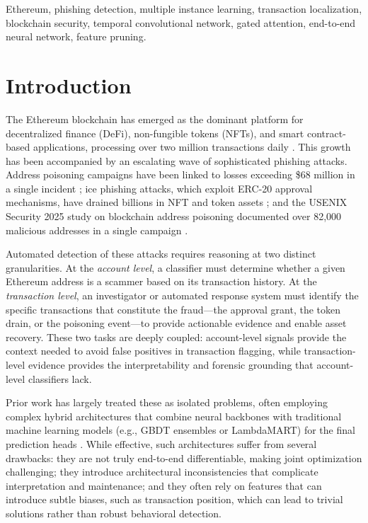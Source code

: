 \documentclass[conference]{IEEEtran}
\begin{document}
\begin{IEEEkeywords}
Ethereum, phishing detection, multiple instance learning, transaction localization, blockchain security, temporal convolutional network, gated attention, end-to-end neural network, feature pruning.
\end{IEEEkeywords}

\section{Introduction}
The Ethereum blockchain has emerged as the dominant platform for decentralized finance (DeFi), non-fungible tokens (NFTs), and smart contract-based applications, processing over two million transactions daily \cite{etherscan}. This growth has been accompanied by an escalating wave of sophisticated phishing attacks. Address poisoning campaigns have been linked to losses exceeding \$68 million in a single incident \cite{address_poisoning}; ice phishing attacks, which exploit ERC-20 approval mechanisms, have drained billions in NFT and token assets \cite{ice_phishing}; and the USENIX Security 2025 study on blockchain address poisoning documented over 82,000 malicious addresses in a single campaign \cite{usenix_poisoning}.

Automated detection of these attacks requires reasoning at two distinct granularities. At the \emph{account level}, a classifier must determine whether a given Ethereum address is a scammer based on its transaction history. At the \emph{transaction level}, an investigator or automated response system must identify the specific transactions that constitute the fraud---the approval grant, the token drain, or the poisoning event---to provide actionable evidence and enable asset recovery. These two tasks are deeply coupled: account-level signals provide the context needed to avoid false positives in transaction flagging, while transaction-level evidence provides the interpretability and forensic grounding that account-level classifiers lack.

Prior work has largely treated these as isolated problems, often employing complex hybrid architectures that combine neural backbones with traditional machine learning models (e.g., GBDT ensembles or LambdaMART) for the final prediction heads \cite{bert4eth,zipzap,lmae4eth}. While effective, such architectures suffer from several drawbacks: they are not truly end-to-end differentiable, making joint optimization challenging; they introduce architectural inconsistencies that complicate interpretation and maintenance; and they often rely on features that can introduce subtle biases, such as transaction position, which can lead to trivial solutions rather than robust behavioral detection.
\end{document}

